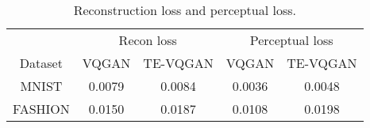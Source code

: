 \begin{table}[ht]
\footnotesize
\centering
\caption{Reconstruction loss and perceptual loss.}
\begin{tabular}{c|cc|cc}
\hline
        & \multicolumn{2}{c|}{Recon loss}          & \multicolumn{2}{c}{Perceptual loss}      \\ \cline{2-5} 
Dataset & VQGAN & TE-VQGAN     & VQGAN & TE-VQGAN     \\ 
\hline
MNIST   & 0.0079                      & 0.0084 & 0.0036                      & 0.0048 \\
FASHION & 0.0150                      & 0.0187 & 0.0108                      & 0.0198 \\ 
\hline
\end{tabular}
\label{tab:recon_loss}
\end{table}
